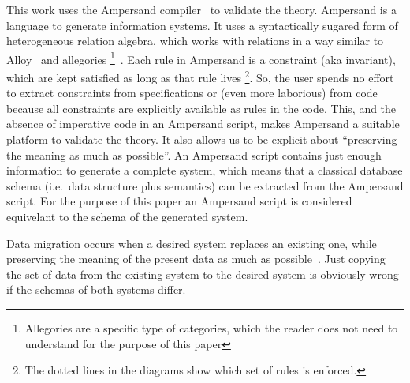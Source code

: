 \documentclass{elsarticle}
\begin{document}
   This work uses the Ampersand compiler~\cite{Joosten-JLAMP2018, JoostenRAMiCS2017} to validate the theory.
   Ampersand is a language to generate information systems.
   It uses a syntactically sugared form of heterogeneous relation algebra,
   which works with relations in a way similar to Alloy~\cite{Alloy2006} and allegories%
\footnote{Allegories are a specific type of categories, which the reader does not need to understand for the purpose of this paper}~\cite{Zielinski2013}.
   Each rule in Ampersand is a constraint (aka invariant), which are kept satisfied as long as that rule lives%
\footnote{The dotted lines in the diagrams show which set of rules is enforced.}.
   So, the user spends no effort to extract constraints from specifications or (even more laborious) from code
   because all constraints are explicitly available as rules in the code.
   This, and the absence of imperative code in an Ampersand script, makes Ampersand a suitable platform to validate the theory.
   It also allows us to be explicit about ``preserving the meaning as much as possible''.
   An Ampersand script contains just enough information to generate a complete system,
   which means that a classical database schema (i.e.\ data structure plus semantics) can be extracted from the Ampersand script.
   For the purpose of this paper an Ampersand script is considered equivelant to the schema of the generated system.

   Data migration occurs when a desired system replaces an existing one,
   while preserving the meaning of the present data as much as possible~\cite{Spivak2012}.
   Just copying the set of data from the existing system to the desired system is obviously wrong if the schemas of both systems differ.
\end{document}
